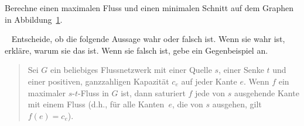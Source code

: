 \documentclass{uebung_cs}
\begin{document}
\begin{aufgabe}
    Berechne einen maximalen Fluss und einen minimalen Schnitt auf dem Graphen in Abbildung~\ref{Figure_4}.
    
    \begin{figure}[ht]
	\begin{center}
		\caption{\label{Figure_4}}
	\end{center}
\end{figure}
\end{aufgabe}

\begin{aufgabe}\
    Entscheide, ob die folgende Aussage wahr oder falsch ist. Wenn sie wahr ist, erkläre, warum sie das ist. Wenn sie falsch ist, gebe ein Gegenbeispiel an.
    \begin{quote}
        Sei $G$ ein beliebiges Flussnetzwerk mit einer Quelle $s$, einer Senke $t$ und einer positiven, ganzzahligen Kapazität $c_e$ auf jeder Kante $e$. Wenn $f$ ein maximaler $s$-$t$-Fluss in $G$ ist, dann saturiert $f$ jede von $s$ ausgehende Kante mit einem Fluss (d.h., für alle Kanten~$e$, die von $s$ ausgehen, gilt $f(e) = c_e$).
    \end{quote}
\end{aufgabe}
\end{document}
